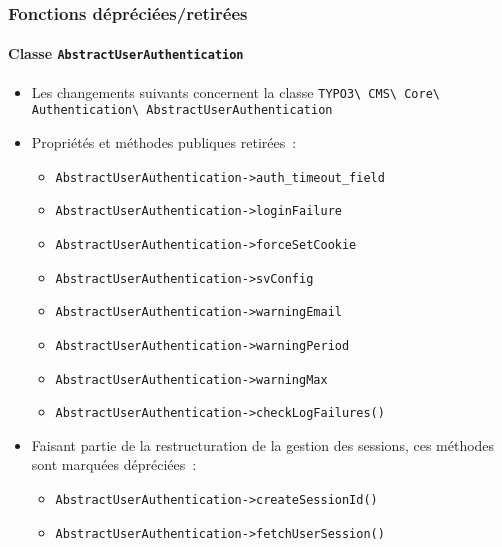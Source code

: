 %

\begin{frame}[fragile]
	\frametitle{Fonctions dépréciées/retirées}
	\framesubtitle{Classe \texttt{AbstractUserAuthentication}}

	\begin{itemize}
		\item Les changements suivants concernent la classe\newline
			\small\texttt{TYPO3\textbackslash
				CMS\textbackslash
				Core\textbackslash
				Authentication\textbackslash
				AbstractUserAuthentication}\normalsize

		\item Propriétés et méthodes publiques retirées~:

			\begin{itemize}\smaller
				\item \texttt{AbstractUserAuthentication->auth\_timeout\_field}
				\item \texttt{AbstractUserAuthentication->loginFailure}
				\item \texttt{AbstractUserAuthentication->forceSetCookie}
				\item \texttt{AbstractUserAuthentication->svConfig}
				\item \texttt{AbstractUserAuthentication->warningEmail}
				\item \texttt{AbstractUserAuthentication->warningPeriod}
				\item \texttt{AbstractUserAuthentication->warningMax}
				\item \texttt{AbstractUserAuthentication->checkLogFailures()}
			\end{itemize}\normalsize

		\item Faisant partie de la restructuration de la gestion des sessions, ces méthodes sont marquées dépréciées~:

			\begin{itemize}\smaller
				\item \texttt{AbstractUserAuthentication->createSessionId()}
				\item \texttt{AbstractUserAuthentication->fetchUserSession()}
			\end{itemize}\normalsize


	\end{itemize}

\end{frame}

